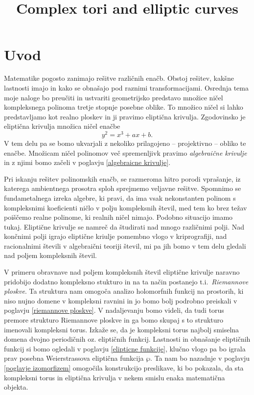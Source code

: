 \documentclass[mat1]{fmfdelo}
\title{Complex tori and elliptic curves}
\begin{document}

\section{Uvod}

Matematike pogosto zanimajo rešitve različnih enačb. Obstoj rešitev, kakšne lastnosti imajo in
kako se obnašajo pod raznimi transformacijami. Osrednja tema moje naloge bo preučiti in ustvariti
geometrijsko predstavo množice ničel kompleksnega polinoma tretje stopnje posebne oblike. 
To množico ničel si lahko predstavljamo kot realno ploskev in ji pravimo eliptična krivulja.   
Zgodovinsko je eliptična krivulja množica ničel enačbe
$$ y^2 = x^3 + ax + b. $$
V tem delu pa se bomo ukvarjali z nekoliko prilagojeno -- projektivno -- obliko te enačbe. Množicam ničel
polinomov več spremenljivk pravimo \emph{algebraične krivulje} in z njimi bomo začeli v poglavju \ref{algebraicne krivulje}. 
\par 
Pri iskanju rešitev
polinomskih enačb, se razmeroma hitro porodi vprašanje, iz katerega ambientnega prosotra 
sploh sprejmemo veljavne rešitve. Spomnimo se fundametalnega izreka algebre, ki pravi, da ima
vsak nekonstanten polinom s kompleksnimi koeficienti ničlo v polju kompleksnih števil, med tem
ko brez težav poiščemo realne polinome, ki realnih ničel nimajo. Podobno situacijo imamo tukaj. 
Eliptične krivulje se namreč da študirati nad mnogo različnimi polji. Nad končnimi polji igrajo
eliptične kriulje pomembno vlogo v kriprografiji, nad racionalnimi števili v algebraični teoriji
števil, mi pa jih bomo v tem delu gledali nad poljem kompleksnih števil. 
\par
V primeru obravnave nad poljem kompleksnih števil eliptične
krivulje naravno pridobijo dodatno kompleksno stukturo in na ta način postanejo t.i.\ \emph{Riemannove ploskve}. Ta struktura nam omogoča analizo holomorfnih funkcij na prostorih, ki niso nujno domene v kompleksni ravnini in jo
bomo bolj podrobno preiskali v poglavju \ref{riemannove ploskve}. V nadaljevanju bomo videli, da tudi torus premore strukturo Riemannove ploskve in ga bomo skupaj s to strukturo imenovali kompleksni torus. Izkaže se, da je kompleksni
torus najbolj smiselna domena dvojno periodičnih oz. eliptičnih funkcij. Lastnosti in obnašanje eliptičnih funkcij si bomo ogledali v poglavju \ref{elipticne funkcije}, klučno vlogo pa bo igrala prav posebna Weierstrassova eliptična funkcija $\wp$. Ta nam bo nazadnje v poglavju \ref{poglavje izomorfizem} omogočila konstrukcijo preslikave, ki bo pokazala, da sta kompleksni torus in eliptična krivulja v nekem smislu enaka matematična objekta.
\end{document}
